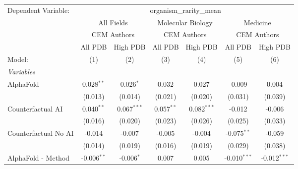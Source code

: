 \begingroup
\centering
\begin{tabular}{lcccccc}
   \tabularnewline \midrule \midrule
   Dependent Variable: & \multicolumn{6}{c}{organism\_rarity\_mean}\\
 & \multicolumn{2}{c}{All Fields} & \multicolumn{2}{c}{Molecular Biology} & \multicolumn{2}{c}{Medicine} \\
\cmidrule(lr){2-3} \cmidrule(lr){4-5} \cmidrule(lr){6-7}
 & \multicolumn{2}{c}{CEM Authors} & \multicolumn{2}{c}{CEM Authors} & \multicolumn{2}{c}{CEM Authors} \\
\cmidrule(lr){2-3} \cmidrule(lr){4-5} \cmidrule(lr){6-7}
 & \multicolumn{1}{c}{All PDB} & \multicolumn{1}{c}{High PDB} & \multicolumn{1}{c}{All PDB} & \multicolumn{1}{c}{High PDB} & \multicolumn{1}{c}{All PDB} & \multicolumn{1}{c}{High PDB} \\
\cmidrule(lr){2-2} \cmidrule(lr){3-3} \cmidrule(lr){4-4} \cmidrule(lr){5-5} \cmidrule(lr){6-6} \cmidrule(lr){7-7}
   Model:                                                     & (1)            & (2)            & (3)           & (4)           & (5)            & (6)\\  
   \midrule
   \emph{Variables}\\
   AlphaFold                                                  & 0.028$^{**}$   & 0.026$^{*}$    & 0.032         & 0.027         & -0.009         & 0.004\\   
                                                              & (0.013)        & (0.014)        & (0.021)       & (0.020)       & (0.031)        & (0.039)\\   
   Counterfactual AI                                          & 0.040$^{**}$   & 0.067$^{***}$  & 0.057$^{**}$  & 0.082$^{***}$ & -0.012         & -0.006\\   
                                                              & (0.016)        & (0.020)        & (0.023)       & (0.026)       & (0.025)        & (0.033)\\   
   Counterfactual No AI                                       & -0.014         & -0.007         & -0.005        & -0.004        & -0.075$^{**}$  & -0.059\\   
                                                              & (0.014)        & (0.019)        & (0.016)       & (0.019)       & (0.029)        & (0.038)\\   
   AlphaFold - Method                                         & -0.006$^{**}$  & -0.006$^{*}$   & 0.007         & 0.005         & -0.010$^{***}$ & -0.012$^{***}$\\   

\end{tabular}
